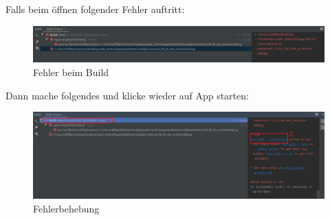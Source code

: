 \documentclass[12pt, onecolumn, notitlepage]{scrartcl}
\begin{document}
Falls beim öffnen folgender Fehler auftritt:
\begin{figure}[H]
\includegraphics[width=1\textwidth]{build_Fehler.PNG}
\caption{Fehler beim Build}
\end{figure}
Dann mache folgendes und klicke wieder auf App starten:
\begin{figure}[H]
\includegraphics[width=1\textwidth]{build_Klick.PNG}
\caption{Fehlerbehebung}	
\end{figure}
\end{document}
